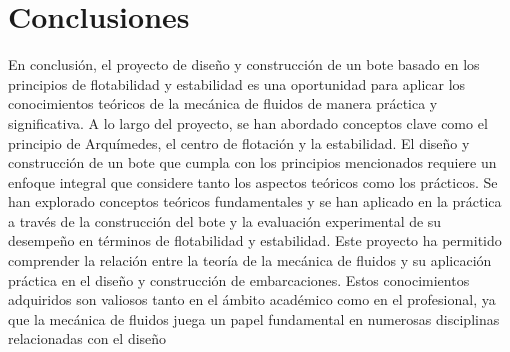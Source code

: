 \documentclass[letterpaper]{article}
\begin{document}
\section{Conclusiones}
En conclusión, el proyecto de diseño y construcción de un bote basado en los principios de flotabilidad y estabilidad es una oportunidad para aplicar los conocimientos teóricos de la mecánica de fluidos de manera práctica y significativa. A lo largo del proyecto, se han abordado conceptos clave como el principio de Arquímedes, el centro de flotación y la estabilidad.
El diseño y construcción de un bote que cumpla con los principios mencionados requiere un enfoque integral que considere tanto los aspectos teóricos como los prácticos. Se han explorado conceptos teóricos fundamentales y se han aplicado en la práctica a través de la construcción del bote y la evaluación experimental de su desempeño en términos de flotabilidad y estabilidad.
Este proyecto ha permitido comprender la relación entre la teoría de la mecánica de fluidos y su aplicación práctica en el diseño y construcción de embarcaciones. Estos conocimientos adquiridos son valiosos tanto en el ámbito académico como en el profesional, ya que la mecánica de fluidos juega un papel fundamental en numerosas disciplinas relacionadas con el diseño


\newpage
\section*{}

\nocite{*}

\end{document}

